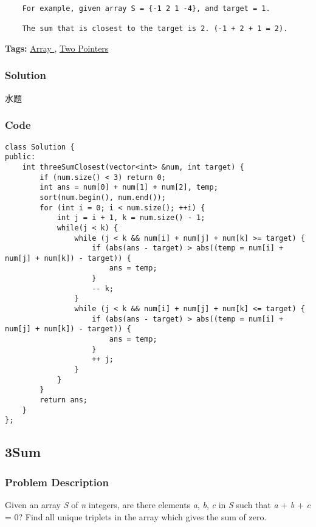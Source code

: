 \documentclass{article}
\begin{document}
\begin{CJK*}{UTF8}{gkai}
\begin{verbatim}
    For example, given array S = {-1 2 1 -4}, and target = 1.

    The sum that is closest to the target is 2. (-1 + 2 + 1 = 2).
\end{verbatim}

\textbf{Tags: }
\hyperref[ Array ]{ Array },  \hyperref[ Two Pointers ]{ Two Pointers }



\subsubsection*{Solution}
水题

\subsubsection*{Code}
\begin{lstlisting}
class Solution {
public:
    int threeSumClosest(vector<int> &num, int target) {
        if (num.size() < 3) return 0;
        int ans = num[0] + num[1] + num[2], temp;
        sort(num.begin(), num.end());
        for (int i = 0; i < num.size(); ++i) {
            int j = i + 1, k = num.size() - 1;
            while(j < k) {
                while (j < k && num[i] + num[j] + num[k] >= target) {
                    if (abs(ans - target) > abs((temp = num[i] + num[j] + num[k]) - target)) {
                        ans = temp;
                    }
                    -- k;
                }
                while (j < k && num[i] + num[j] + num[k] <= target) {
                    if (abs(ans - target) > abs((temp = num[i] + num[j] + num[k]) - target)) {
                        ans = temp;
                    }
                    ++ j;
                }
            }
        }
        return ans;
    }
}; 
\end{lstlisting}


\subsection{ 3Sum }
\label{ 3Sum }

\subsubsection*{Problem Description}
Given an array \emph{S} of \emph{n} integers, are there elements \emph{a}, \emph{b}, \emph{c} in \emph{S} such that \emph{a} + \emph{b} + \emph{c} = 0? Find all unique triplets in the array which gives the sum of zero.


\end{CJK*}
\end{document}
